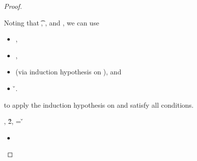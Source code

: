 \begin{lemma}
\begin{proof}
\begin{case}[B-BetaClosure]
\begin{itemize}
\begin{subcase}[T-App]
                    Noting that 
      \issubtypein{}  { {} {\x{}}}{\t{}},
       {\thenprop {\prop{}}},
       {\elseprop {\prop{}}}
      and
       {\object{}},
                    we can use
         \begin{itemize}
           \item
        \judgementrewrite {\propenvc{}}
                          {}
                          {}
               {}
                          {}
                          {}, 
           \item
              ,
           \item
{} (via induction hypothesis on {}), and
           \item 
         {}
         {\v{}}.
         \end{itemize}
         to apply the induction hypothesis on {} and satisfy
         all conditions.

\end{subcase}
\end{itemize}
\end{case}

\begin{case}[B-Delta]
  \opsem {\openv{}} {} {\const{}},
  \opsem {\openv{}} {} {\v{2}},
   = \v{}

\begin{itemize}
  \item[]
\begin{subcase}[T-App]
  \ 


\end{subcase}
\end{itemize}
\end{case}
\end{proof}
\end{lemma}
